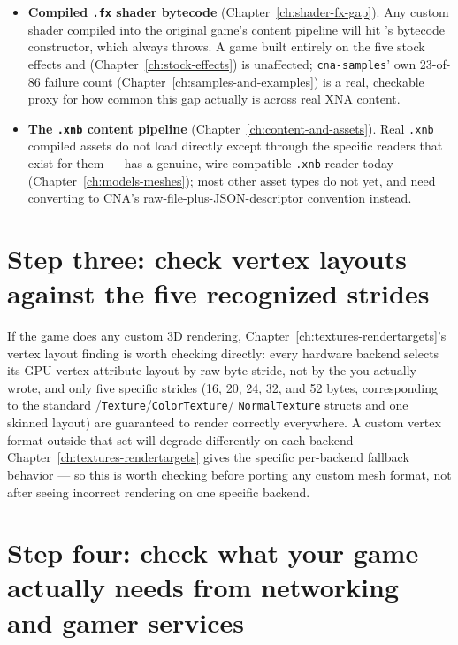 \begin{itemize}
  \item \textbf{Compiled \texttt{.fx} shader bytecode} (Chapter~\ref{ch:shader-fx-gap}).
        Any custom shader compiled into the original game's content pipeline will hit
        's bytecode constructor, which always throws. A game built entirely
        on the five stock effects and  (Chapter~\ref{ch:stock-effects})
        is unaffected; \texttt{cna-samples}' own 23-of-86 failure count
        (Chapter~\ref{ch:samples-and-examples}) is a real, checkable proxy for how common
        this gap actually is across real XNA content.
  \item \textbf{The \texttt{.xnb} content pipeline} (Chapter~\ref{ch:content-and-assets}).
        Real \texttt{.xnb} compiled assets do not load directly except through the specific
        readers that exist for them ---  has a genuine, wire-compatible
        \texttt{.xnb} reader today (Chapter~\ref{ch:models-meshes}); most other asset types do
        not yet, and need converting to CNA's raw-file-plus-JSON-descriptor convention
        instead.
\end{itemize}

\section{Step three: check vertex layouts against the five recognized strides}

If the game does any custom 3D rendering, Chapter~\ref{ch:textures-rendertargets}'s vertex
layout finding is worth checking directly: every hardware backend selects its GPU
vertex-attribute layout by raw byte stride, not by the  you
actually wrote, and only five specific strides (16, 20, 24, 32, and 52 bytes, corresponding to
the standard /\texttt{Texture}/\texttt{ColorTexture}/%
\texttt{NormalTexture} structs and one skinned layout) are guaranteed to render correctly
everywhere. A custom vertex format outside that set will degrade differently on each backend
--- Chapter~\ref{ch:textures-rendertargets} gives the specific per-backend fallback behavior
--- so this is worth checking before porting any custom mesh format, not after seeing
incorrect rendering on one specific backend.

\section{Step four: check what your game actually needs from networking and gamer services}

